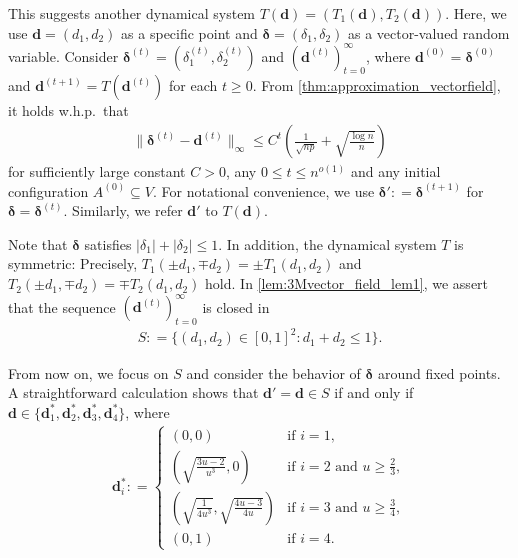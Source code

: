 \documentclass[letterpaper,11pt]{article}
\def\defeq{\mathrel{\mathop:}=}%
\begin{document}
This suggests another dynamical system $T(\mathbf{d})=(T_1(\mathbf{d}),T_2(\mathbf{d}))$.
Here, we use $\mathbf{d}=(d_1,d_2)$ as a specific point and ${\boldsymbol \delta}=(\delta_1,\delta_2)$ as a vector-valued random variable.
Consider ${\boldsymbol \delta^{(t)}}=(\delta^{(t)}_1,\delta^{(t)}_2)$ and $(\mathbf{d}^{(t)})_{t=0}^\infty$, where $\mathbf{d}^{(0)}={\boldsymbol \delta}^{(0)}$ and $\mathbf{d}^{(t+1)}=T(\mathbf{d}^{(t)})$ for each $t\geq 0$.
From \cref{thm:approximation_vectorfield}, it holds w.h.p.~that
\begin{align}
\|{\boldsymbol \delta}^{(t)}-\mathbf{d}^{(t)}\|_\infty \leq C^t \left(\frac{1}{\sqrt{np}}+\sqrt{\frac{\log n}{n}}\right) \label{eqn:delta_d_diff}
\end{align}
for sufficiently large constant $C>0$, any $0\leq t\leq n^{o(1)}$ and any initial configuration $A^{(0)}\subseteq V$.
For notational convenience, we use ${\boldsymbol \delta}'\defeq {\boldsymbol \delta}^{(t+1)}$ for ${\boldsymbol \delta}={\boldsymbol \delta}^{(t)}$.
Similarly, we refer $\mathbf{d}'$ to $T(\mathbf{d})$.

Note that ${\boldsymbol \delta}$ satisfies $|\delta_1|+|\delta_2|\leq 1$. %
In addition, the dynamical system $T$ is symmetric: Precisely, $T_1(\pm d_1,\mp d_2) = \pm T_1(d_1,d_2)$ and $T_2(\pm d_1,\mp d_2)=\mp T_2(d_1,d_2)$ hold.
In \cref{lem:3Mvector_field_lem1}, we assert that the sequence $(\mathbf{d}^{(t)})_{t=0}^\infty$ is closed in
\begin{align*}
S\defeq \{(d_1,d_2)\in[0,1]^2:d_1+d_2\leq 1\}.
\end{align*}

From now on, we focus on $S$ and consider the behavior of ${\boldsymbol \delta}$ around fixed points.
A straightforward calculation shows that $\mathbf{d}'=\mathbf{d}\in S$ if and only if $\mathbf{d}\in\{\mathbf{d}^*_1,\mathbf{d}^*_2,\mathbf{d}^*_3,\mathbf{d}^*_4\}$, where
\begin{align} \label{eqn:fixed_points_3M}
\mathbf{d}^*_i \defeq \begin{cases}
(0,0) & \text{if $i=1$},\\
\left(\sqrt{\frac{3u-2}{u^3}},0\right) & \text{if $i=2$ and $u\geq\frac{2}{3}$},\\
\left(\sqrt{\frac{1}{4u^3}},\sqrt{\frac{4u-3}{4u}} \right) & \text{if $i=3$ and $u\geq\frac{3}{4}$},\\
(0,1) & \text{if $i=4$}.
\end{cases}
\end{align}%
\end{document}

